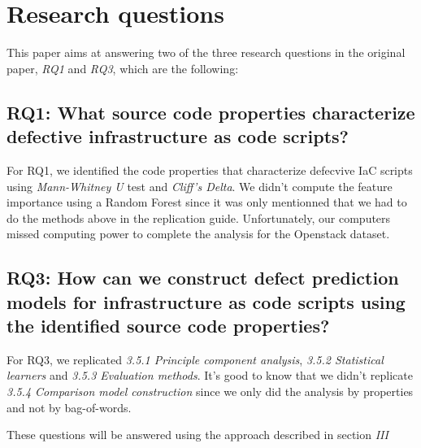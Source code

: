 
\section{Research questions}
This paper aims at answering two of the three research questions in the original paper, \textit{RQ1} and \textit{RQ3}, which are the following:
\subsection{RQ1: What source code properties characterize defective infrastructure as code scripts?}
For RQ1, we identified the code properties that characterize defecvive IaC scripts
using \emph{Mann-Whitney U} test and \emph{Cliff's Delta}. We didn't 
compute the feature importance using a Random Forest since it was only mentionned 
that we had to do the methods above in the replication guide. Unfortunately, 
our computers missed computing power to complete the analysis for the Openstack 
dataset.
\subsection{RQ3: How can we construct defect prediction models for 
infrastructure as code scripts using the identified source code properties?}
For RQ3, we replicated \emph{3.5.1 Principle component analysis},  
\emph{3.5.2 Statistical learners} and \emph{3.5.3 Evaluation methods}. It's good 
to know that we didn't replicate \emph{3.5.4 Comparison model construction} since 
we only did the analysis by properties and not by bag-of-words.

These questions will be answered using the approach described in section \textit{III}
